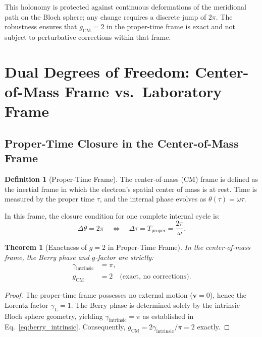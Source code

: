 \documentclass[%
 reprint,
 amsmath,amssymb,
 aps,
 prb,
]{revtex4-2}
\numberwithin{equation}{section}
\newtheorem{theorem}{Theorem}[section]
\theoremstyle{definition}
\newtheorem{definition}{Definition}[section]
\theoremstyle{remark}
\begin{document}
This holonomy is protected against continuous deformations of the meridional path on the Bloch sphere; any change requires a discrete jump of $2\pi$. The robustness ensures that $g_{\text{CM}} = 2$ in the proper-time frame is exact and not subject to perturbative corrections within that frame.

\section{Dual Degrees of Freedom: Center-of-Mass Frame vs.~Laboratory Frame}
\label{sec:dual_frame}

\subsection{Proper-Time Closure in the Center-of-Mass Frame}

\begin{definition}[Proper-Time Frame]
The center-of-mass (CM) frame is defined as the inertial frame in which the electron's spatial center of mass is at rest. Time is measured by the proper time $\tau$, and the internal phase evolves as $\theta(\tau) = \omega \tau$.
\end{definition}

In this frame, the closure condition for one complete internal cycle is:
\begin{equation}
\Delta \theta = 2\pi \quad \Leftrightarrow \quad \Delta \tau = T_{\text{proper}} = \frac{2\pi}{\omega}.
\label{eq:proper_closure}
\end{equation}

\begin{theorem}[Exactness of $g=2$ in Proper-Time Frame]
In the center-of-mass frame, the Berry phase and $g$-factor are strictly:
\begin{align}
\gamma_{\text{intrinsic}} &= \pi, \label{eq:gamma_intrinsic_exact} \\
g_{\text{CM}} &= 2 \quad \text{(exact, no corrections)}. \label{eq:g_CM_exact}
\end{align}
\end{theorem}

\begin{proof}
The proper-time frame possesses no external motion ($\bm{v} = 0$), hence the Lorentz factor $\gamma_L = 1$. The Berry phase is determined solely by the intrinsic Bloch sphere geometry, yielding $\gamma_{\text{intrinsic}} = \pi$ as established in Eq.~\eqref{eq:berry_intrinsic}. Consequently, $g_{\text{CM}} = 2\gamma_{\text{intrinsic}}/\pi = 2$ exactly.
\end{proof}
\end{document}
